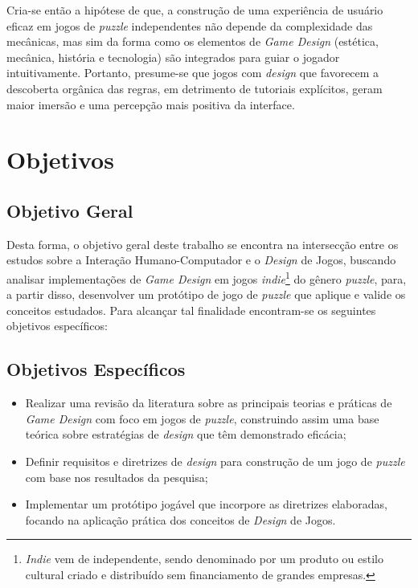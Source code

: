 Cria-se então a hipótese de que, a construção de uma experiência de usuário eficaz em jogos de \textit{puzzle} independentes não depende da complexidade das mecânicas, mas sim da forma como os elementos de \textit{Game Design} (estética, mecânica, história e tecnologia)  são integrados para guiar o jogador intuitivamente. Portanto, presume-se que jogos com \textit{design} que favorecem a descoberta orgânica das regras, em detrimento de tutoriais explícitos, geram maior imersão e uma percepção mais positiva da interface.


\section{Objetivos}

\subsection{Objetivo Geral}

Desta forma, o objetivo geral deste trabalho se encontra na intersecção entre os estudos sobre a Interação Humano-Computador e o \textit{Design} de Jogos, buscando analisar implementações de \textit{Game Design} em jogos \textit{indie}\footnote{\textit{Indie} vem de independente, sendo denominado por um produto ou estilo cultural criado e distribuído sem financiamento de grandes empresas.} do gênero \textit{puzzle}, para, a partir disso, desenvolver um protótipo de jogo de \textit{puzzle} que aplique e valide os conceitos estudados. Para alcançar tal finalidade encontram-se os seguintes objetivos específicos:

\subsection{Objetivos Específicos}
\begin{itemize}
	\item Realizar uma revisão da literatura sobre as principais teorias e práticas de \textit{Game Design} com foco em jogos de \textit{puzzle}, construindo assim uma base teórica sobre estratégias de \textit{design} que têm demonstrado eficácia;
	\item Definir requisitos e diretrizes de \textit{design} para construção de um jogo de \textit{puzzle} com base nos resultados da pesquisa;
	\item Implementar um protótipo jogável que incorpore as diretrizes elaboradas, focando na aplicação prática dos conceitos de \textit{Design} de Jogos.
\end{itemize}
